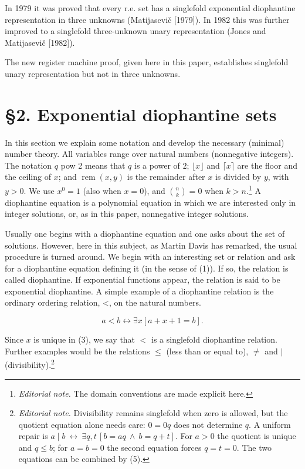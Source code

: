 \documentclass[11pt,leqno]{article}
\newcommand{\origpage}[1]{\marginnote{\footnotesize\textbf{[#1]}}}
\newcommand{\ednote}[1]{\footnote{\textit{Editorial note.} #1}}
\begin{document}
In 1979 it was proved that every r.e. set has a singlefold exponential diophantine representation in three unknowns (Matijasevi\v{c} [1979]). In 1982 this was further improved to a singlefold three-unknown unary representation (Jones and Matijasevi\v{c} [1982]).

The new register machine proof, given here in this paper, establishes singlefold unary representation but not in three unknowns.

\section*{\S2. Exponential diophantine sets} \origpage{820}In this section we explain some notation and develop the necessary (minimal) number theory. All variables range over natural numbers (nonnegative integers). The notation $q$ pow 2 means that $q$ is a power of $2$; $\lfloor x\rfloor$ and $\lceil x\rceil$ are the floor and the ceiling of $x$; and $\operatorname{rem}(x,y)$ is the remainder after $x$ is divided by $y$, with $y>0$. We use $x^0=1$ (also when $x=0$), and $\binom{n}{k}=0$ when $k>n$.\ednote{The domain conventions are made explicit here.} A diophantine equation is a polynomial equation in which we are interested only in integer solutions, or, as in this paper, nonnegative integer solutions.

Usually one begins with a diophantine equation and one asks about the set of solutions. However, here in this subject, as Martin Davis has remarked, the usual procedure is turned around. We begin with an interesting set or relation and ask for a diophantine equation defining it (in the sense of (1)). If so, the relation is called diophantine. If exponential functions appear, the relation is said to be exponential diophantine. A simple example of a diophantine relation is the ordinary ordering relation, <, on the natural numbers.

\begin{equation*}
a<b \leftrightarrow \exists x[a+x+1=b] . \tag{3}\label{eq:3}
\end{equation*}

Since $x$ is unique in (3), we say that $<$ is a singlefold diophantine relation. Further examples would be the relations $\leq$ (less than or equal to), $\neq$ and $\mid$ (divisibility).\ednote{Divisibility remains singlefold when zero is allowed, but the quotient equation alone needs care: $0=0q$ does not determine $q$. A uniform repair is
$ a\mid b\ \longleftrightarrow\ \exists q,t\,[b=aq\ \land\ b=q+t]$.
For $a>0$ the quotient is unique and $q\leq b$; for $a=b=0$ the second equation forces $q=t=0$. The two equations can be combined by (5).}
\end{document}
